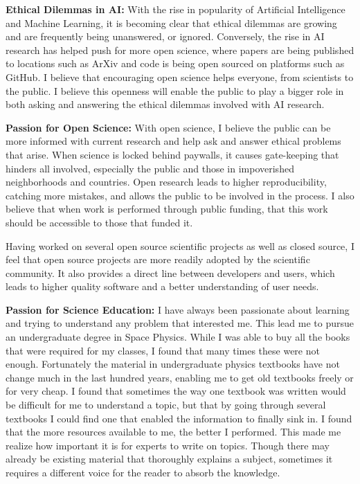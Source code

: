 \documentclass[12pt]{article}
\begin{document}
\textbf{Ethical Dilemmas in AI: }With the rise in popularity of Artificial
Intelligence and Machine Learning, it is becoming clear that ethical dilemmas
are growing and are frequently being unanswered, or ignored. Conversely, the
rise in AI research has helped push for more open science, where papers are
being published to locations such as ArXiv and code is being open sourced on
platforms such as GitHub. I believe that encouraging open science helps
everyone, from scientists to the public. I believe this openness will enable the
public to play a bigger role in both asking and answering the ethical dilemmas
involved with AI research. 


\textbf{Passion for Open Science: }With open science, I believe the public can
be more informed with current research and help ask and answer ethical problems
that arise. When science is locked behind paywalls, it causes gate-keeping that
hinders all involved, especially the public and those in impoverished neighborhoods and countries. Open research leads to higher reproducibility,
catching more mistakes, and allows the public to be involved in the process. I
also believe that when work is performed through public funding, that this work
should be accessible to those that funded it.

Having worked on several open source scientific projects as well as closed
source, I feel that open source projects are more readily adopted
by the scientific community. It also provides a direct line between developers and
users, which leads to higher quality software and a better understanding of
user needs. 

\textbf{Passion for Science Education: }I have always been passionate about
learning and trying to understand any problem that interested me. This lead me
to pursue an undergraduate degree in Space Physics. While I was able to buy all
the books that were required for my classes, I found that many times these were
not enough. Fortunately the material in undergraduate physics textbooks have not
change much in the last hundred years, enabling me to get old textbooks freely
or for very cheap. I found that sometimes the way one textbook was written would
be difficult for me to understand a topic, but that by going through several
textbooks I could find one that enabled the information to finally sink in. I
found that the more resources available to me, the better I performed. This made
me realize how important it is for experts to write on topics. Though there may
already be existing material that thoroughly explains a subject, sometimes it
requires a different voice for the reader to absorb the knowledge.
\end{document}
